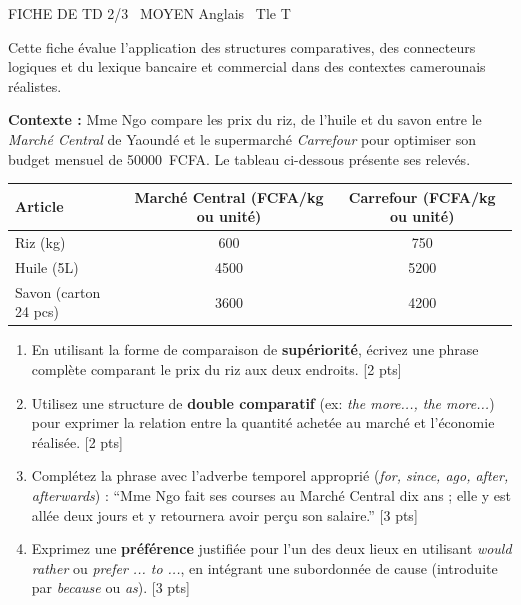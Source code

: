 \documentclass[11pt]{article}
\begin{document}
\begin{tcolorbox}[enhanced,colback=popink,colframe=popink,arc=10pt,boxrule=0pt,left=12pt,right=12pt,top=9pt,bottom=9pt]
{\color{white}\popxbold\small FICHE DE TD 2/3 \textbullet\ MOYEN \hfill Anglais \textbullet\ Tle T\par}
\end{tcolorbox}
\vspace{4pt}
Cette fiche évalue l'application des structures comparatives, des connecteurs logiques et du lexique bancaire et commercial dans des contextes camerounais réalistes.

\begin{exercice}
\textbf{Contexte :} Mme Ngo compare les prix du riz, de l'huile et du savon entre le \textit{Marché Central} de Yaoundé et le supermarché \textit{Carrefour} pour optimiser son budget mensuel de \SI{50000}{FCFA}. Le tableau ci-dessous présente ses relevés.

\begin{tabular}{lcc}
\toprule
\textbf{Article} & \textbf{Marché Central (FCFA/kg ou unité)} & \textbf{Carrefour (FCFA/kg ou unité)} \\
\midrule
Riz (kg) & 600 & 750 \\
Huile (5L) & 4500 & 5200 \\
Savon (carton 24 pcs) & 3600 & 4200 \\
\bottomrule
\end{tabular}

\begin{enumerate}
    \item En utilisant la forme de comparaison de \textbf{supériorité}, écrivez une phrase complète comparant le prix du riz aux deux endroits. [2 pts]
    \item Utilisez une structure de \textbf{double comparatif} (ex: \textit{the more..., the more...}) pour exprimer la relation entre la quantité achetée au marché et l'économie réalisée. [2 pts]
    \item Complétez la phrase avec l'adverbe temporel approprié (\textit{for, since, ago, after, afterwards}) : ``Mme Ngo fait ses courses au Marché Central \underline{\hspace{3cm}} dix ans ; elle y est allée deux jours \underline{\hspace{2cm}} et y retournera \underline{\hspace{2cm}} avoir perçu son salaire.'' [3 pts]
    \item Exprimez une \textbf{préférence} justifiée pour l'un des deux lieux en utilisant \textit{would rather} ou \textit{prefer ... to ...}, en intégrant une subordonnée de cause (introduite par \textit{because} ou \textit{as}). [3 pts]
\end{enumerate}
\end{exercice}
\end{document}
